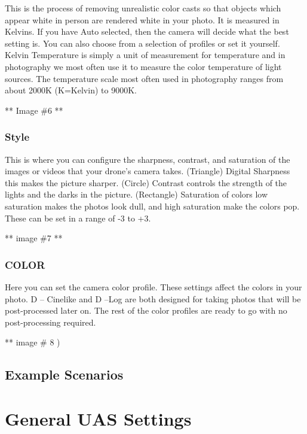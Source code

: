 \documentclass[
]{book}
\begin{document}
This is the process of removing unrealistic color casts so that objects which appear white in person are rendered white in your photo. It is measured in Kelvins. If you have Auto selected, then the camera will decide what the best setting is. You can also choose from a selection of profiles or set it yourself. Kelvin Temperature is simply a unit of measurement for temperature and in photography we most often use it to measure the color temperature of light sources. The temperature scale most often used in photography ranges from about 2000K (K=Kelvin) to 9000K.

** Image \#6 **

\hypertarget{style}{%
\subsection{Style}\label{style}}

This is where you can configure the sharpness, contrast, and saturation of the images or videos that your drone's camera takes. (Triangle) Digital Sharpness this makes the picture sharper. (Circle) Contrast controls the strength of the lights and the darks in the picture. (Rectangle) Saturation of colors low saturation makes the photos look dull, and high saturation make the colors pop. These can be set in a range of -3 to +3.

** image \#7 **

\hypertarget{color}{%
\subsection{COLOR}\label{color}}

Here you can set the camera color profile. These settings affect the colors in your photo. D -- Cinelike and D --Log are both designed for taking photos that will be post-processed later on. The rest of the color profiles are ready to go with no post-processing required.

** image \# 8 )

\hypertarget{example-scenarios}{%
\section{Example Scenarios}\label{example-scenarios}}

\hypertarget{ch-uas-settings.Rmd}{%
\chapter{General UAS Settings}\label{ch-uas-settings.Rmd}}
\end{document}
